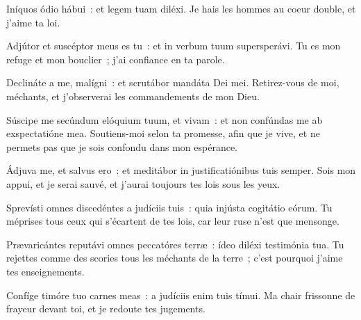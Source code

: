 \begin{paracol}{2}

\LigneParacol{0cm}
{Iníquos ódio hábui~: \GreStar{} et legem tuam diléxi.}
{Je hais les hommes au coeur double, et j'aime ta loi.}

\LigneParacol{0.2cm}
{Adjútor et suscéptor meus es tu~: \GreStar{} et in verbum tuum supersperávi.}
{Tu es mon refuge et mon bouclier~; j'ai confiance en ta parole.}

\LigneParacol{0.2cm}
{Declináte a me, malígni~: \GreStar{} et scrutábor mandáta Dei mei.}
{Retirez-vous de moi, méchants, et j'observerai les commandements de mon Dieu.}

\LigneParacol{0.2cm}
{Súscipe me secúndum elóquium  tuum, et vivam~: \GreStar{} et non confúndas me ab exspectatióne mea.}
{Soutiens-moi selon ta promesse, afin que je vive, et ne permets pas que je sois confondu dans mon espérance.}

\LigneParacol{0.2cm}
{Ádjuva me, et salvus ero~: \GreStar{} et meditábor in justificatiónibus tuis semper.}
{Sois mon appui, et je serai sauvé, et j'aurai toujours tes lois sous les yeux.}

\LigneParacol{0.2cm}
{Sprevísti omnes discedéntes a judíciis tuis~: \GreStar{} quia injústa cogitátio eórum.}
{Tu méprises tous ceux qui s'écartent de tes lois, car leur ruse n'est que mensonge.}

\LigneParacol{0.2cm}
{Prævaricántes reputávi omnes peccatóres terræ~: \GreStar{} ídeo diléxi testimónia tua.}
{Tu rejettes comme des scories tous les méchants de la terre~; c'est pourquoi j'aime tes enseignements.}

\LigneParacol{0.2cm}
{Confíge timóre tuo carnes meas~: \GreStar{} a judíciis enim tuis tímui.}
{Ma chair frissonne de frayeur devant toi, et je redoute tes jugements. }

\end{paracol}
\Gloria

